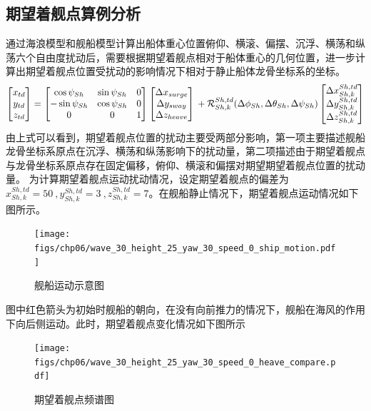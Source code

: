 \subsection{期望着舰点算例分析}
通过海浪模型和舰船模型计算出船体重心位置俯仰、横滚、偏摆、沉浮、横荡和纵荡六个自由度扰动后，需要根据期望着舰点相对于船体重心的几何位置，进一步计算出期望着舰点位置受扰动的影响情况下相对于静止船体龙骨坐标系的坐标。
\begin{equation}
\begin{bmatrix}  x_{td} \\ y_{td} \\z_{td} \end{bmatrix} = \begin{bmatrix}	\cos \psi_{Sh} & \sin \psi_{Sh}  & 0     \\	 -\sin \psi_{Sh} & \cos \psi_{Sh}   & 0 \\ 	0   & 0 & 1 \end{bmatrix} \begin{bmatrix} \Delta x_{surge} \\ \Delta y_{sway} \\ \Delta z_{heave} \end{bmatrix} \\+ \mathcal{R}_{Sh,k}^{Sh,td}(\Delta \phi_{Sh}, \Delta \theta_{Sh}, \Delta \psi_{Sh}) \begin{bmatrix} \Delta x_{Sh,k}^{Sh,td} \\ \Delta y_{Sh,k}^{Sh,td} \\ \Delta z_{Sh,k}^{Sh,td} \end{bmatrix}
\end{equation}
由上式可以看到，期望着舰点位置的扰动主要受两部分影响，第一项主要描述舰船龙骨坐标系原点在沉浮、横荡和纵荡影响下的扰动量，第二项描述由于期望着舰点与龙骨坐标系原点存在固定偏移，俯仰、横滚和偏摆对期望期望着舰点位置的扰动量。
为计算期望着舰点运动扰动情况，设定期望着舰点的偏差为$x_{Sh,k}^{Sh,td} =50\ , y_{Sh,k}^{Sh,td}= 3\ ,z_{Sh,k}^{Sh,td}=7$。在舰船静止情况下，期望着舰点运动情况如下图所示。
\begin{figure}[!ht]
	\centering
	\texttt{[image: figs/chp06/wave\_30\_height\_25\_yaw\_30\_speed\_0\_ship\_motion.pdf]}	
	\caption{舰船运动示意图}
	\label{fig:wave_30_height_25_yaw_30_speed_0_ship_motion}
\end{figure}
图中红色箭头为初始时舰船的朝向，在没有向前推力的情况下，舰船在海风的作用下向后侧运动。此时，期望着舰点变化情况如下图所示
\begin{figure}[!ht]
	\centering
	\texttt{[image: figs/chp06/wave\_30\_height\_25\_yaw\_30\_speed\_0\_heave\_compare.pdf]}	
	\caption{期望着舰点频谱图}
	\label{fig:wave_30_height_25_yaw_30_speed_0_heave_compare}
\end{figure}

